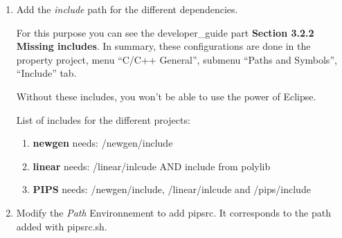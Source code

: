 \documentclass[a4paper]{article}
\begin{document}
\begin{enumerate}
\item Add the \emph{include} path for the different dependencies.

For this purpose you can see the developer\_guide part \textbf{Section 3.2.2 Missing includes}.
In summary, these configurations are done in the property project, menu ``C/C++ General'', submenu ``Paths and Symbols'', ``Include'' tab.

Without these includes, you won't be able to use the power of Eclipse.

List of includes for the different projects:
\begin{enumerate}
\item \textbf{newgen} needs: /newgen/include
\item \textbf{linear} needs: /linear/inlcude AND include from polylib
\item \textbf{PIPS} needs:   /newgen/include, /linear/inlcude and /pips/include
\end{enumerate}

\item Modify the \emph{Path} Environnement to add pipsrc. It corresponds to the path added with pipsrc.sh.
\label{enum:it:addpath}


\end{enumerate}
\end{document}
